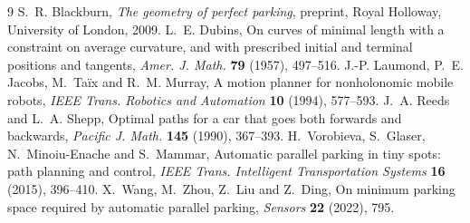 \begin{thebibliography}{9}
S.~R. Blackburn, \emph{The geometry of perfect parking}, preprint, Royal Holloway, University of London, 2009.
L.~E. Dubins, On curves of minimal length with a constraint on average curvature, and with prescribed initial and terminal positions and tangents, \emph{Amer. J. Math.} \textbf{79} (1957), 497--516.
J.-P. Laumond, P.~E. Jacobs, M.~Ta\"ix and R.~M. Murray, A motion planner for nonholonomic mobile robots, \emph{IEEE Trans. Robotics and Automation} \textbf{10} (1994), 577--593.
J.~A. Reeds and L.~A. Shepp, Optimal paths for a car that goes both forwards and backwards, \emph{Pacific J. Math.} \textbf{145} (1990), 367--393.
H.~Vorobieva, S.~Glaser, N.~Minoiu-Enache and S.~Mammar, Automatic parallel parking in tiny spots: path planning and control, \emph{IEEE Trans. Intelligent Transportation Systems} \textbf{16} (2015), 396--410.
X.~Wang, M.~Zhou, Z.~Liu and Z.~Ding, On minimum parking space required by automatic parallel parking, \emph{Sensors} \textbf{22} (2022), 795.
\end{thebibliography}

